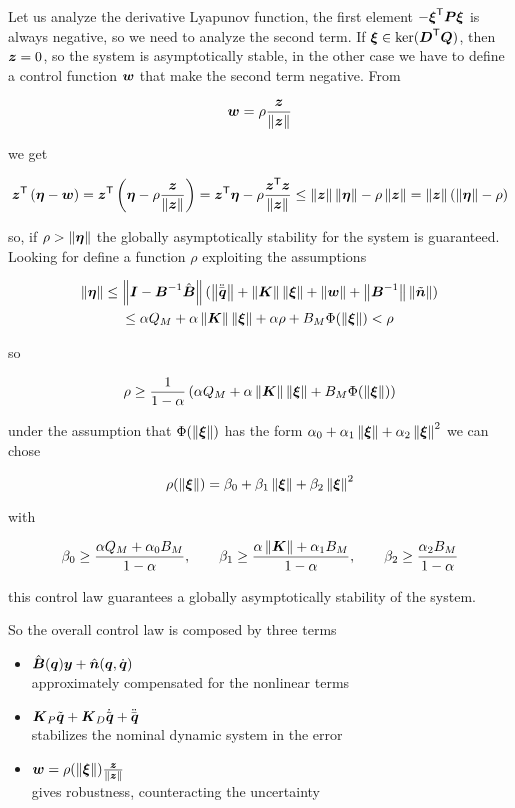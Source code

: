 Let us analyze the derivative Lyapunov function, the first element $- \vect\xi^\trans \matr P \vect\xi$ is always negative, so we need to analyze the second term.
If $\vect\xi \in \ker(\matr D^\trans \matr Q)$, then $\vect z = 0$, so the system is asymptotically stable, in the other case we have to define a control function $\vect w$ that make the second term negative.
From

\[
	\vect w = \rho \frac{\vect z}{\norm{\vect z}}
\]

we get

\[
	\vect z^\trans \left(\vect\eta - \vect w \right) =
	\vect z^\trans \left(\vect\eta - \rho \frac{\vect z}{\norm{\vect z}} \right) =
	\vect z^\trans \vect\eta - \rho \frac{\vect z^\trans \vect z}{\norm{\vect z}} \le \norm{\vect z}\norm{\vect\eta}-\rho\norm{\vect z} =
	\norm{\vect z}(\norm{\vect\eta} - \rho)
\]

so, if $\rho > \norm{\vect\eta}$ the globally asymptotically stability for the system is guaranteed.
Looking for define a function $\rho$ exploiting the assumptions

\begin{multline*}
    \norm{\vect\eta} \le
    	\norm{\I - \B^\inv \Bs} (\norm{\ddqd} + \norm{\K}\norm{\vect\xi} + \norm{\vect w} + \norm{\B^\inv}\norm{\ner}) \\
    	\le \alpha Q_M + \alpha \norm{\K} \norm{\vect\xi} + \alpha \rho + B_M \Phi(\norm{\vect\xi}) < \rho
\end{multline*}

so

\[
	\rho \ge \frac{1}{1-\alpha} \left(\alpha Q_M + \alpha \norm{\K} \norm{\vect\xi} + B_M \Phi(\norm{\vect\xi}) \right)
\]

under the assumption that $\Phi(\norm{\vect\xi})$ has the form $\alpha_0 + \alpha_1 \norm{\vect\xi} + \alpha_2 \norm{\vect\xi}^2$ we can chose

\[
	\rho(\norm{\vect \xi}) = \beta_0 + \beta_1 \norm{\vect\xi} + \beta_2 \norm{\vect\xi}^2
\]

with

\[
	\beta_0 \ge \frac{\alpha Q_M + \alpha_0 B_M}{1 - \alpha}, \qquad
	\beta_1 \ge \frac{\alpha \norm{\K} + \alpha_1 B_M}{1 - \alpha}, \qquad
	\beta_2 \ge \frac{\alpha_2 B_M}{1 - \alpha}
\]

this control law guarantees a globally asymptotically stability of the system.

So the overall control law is composed by three terms

\begin{itemize}
	\item $\Bs(\q)\y + \ns(\q,\dq)$ \\
	approximately compensated for the nonlinear terms

	\item $\K_P\qe + \K_D\dqe + \ddqd$ \\
	stabilizes the nominal dynamic system in the error

	\item $\vect w = \rho(\norm{\vect \xi}) \frac{\vect z}{\norm{\vect z}}$ \\
	gives robustness, counteracting the uncertainty
\end{itemize}

